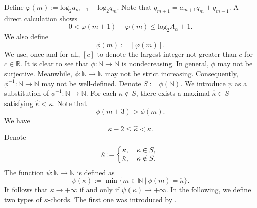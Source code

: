 \documentclass{amsart}
\theoremstyle{definition}
\begin{document}
Define $\varphi(m):=\mathrm{log}_2a_{m+1}+\mathrm{log}_2q_{m}$. Note that $q_{m+1}=a_{m+1}q_m+q_{m-1}$. A direct calculation shows
\begin{equation}
0<\varphi(m+1)-\varphi(m)\leq  \mathrm{log}_2A_\alpha+1.
\end{equation}
We also define
\begin{equation}\label{phiex}
\phi(m):=[\varphi(m)].
\end{equation}
We use, once and for all,  $[c]$ to denote the largest integer not greater than $c$ for $c\in \mathbb{R}$. It is clear to see that $\phi:\mathbb{N}\to\mathbb{N}$ is nondecreasing. In general, $\phi$ may not be surjective. Meanwhile, $\phi:\mathbb{N}\to\mathbb{N}$ may not be strict increasing. Consequently, $\phi^{-1}:\mathbb{N}\to \mathbb{N}$ may not be well-defined. Denote $S:=\phi(\mathbb{N})$. We introduce $\psi$ as a substitution of $\phi^{-1}:\mathbb{N}\to \mathbb{N}$. For each $\kappa\notin S$, there exists a maximal $\hat{\kappa}\in S$ satisfying $\hat{\kappa}<\kappa$.  Note that
\begin{equation}\label{disp3}
\phi(m+3)>\phi(m).
\end{equation}
We have
\[\kappa-2\leq \hat{\kappa}<\kappa.\]Denote
\[\check{\kappa}:=\left\{\begin{array}{ll}
	\hspace{-0.4em} \kappa,\quad \kappa\in S,\\
	\hspace{-0.4em} \hat{\kappa},\quad \kappa\notin S.
\end{array}\right.\]
The function $\psi:\mathbb{N}\to \mathbb{N}$ is defined as
\begin{equation}\label{phius}
\psi(\kappa):=\min\{m\in \mathbb{N}\ |\ \phi(m)=\check{\kappa}\}.
\end{equation}
It follows that $\kappa\to+\infty$ if and only if $\psi(\kappa)\to+\infty$. In the following, we define two types of $\kappa$-chords. The first one was introduced by \cite{KO1}.
\end{document}

